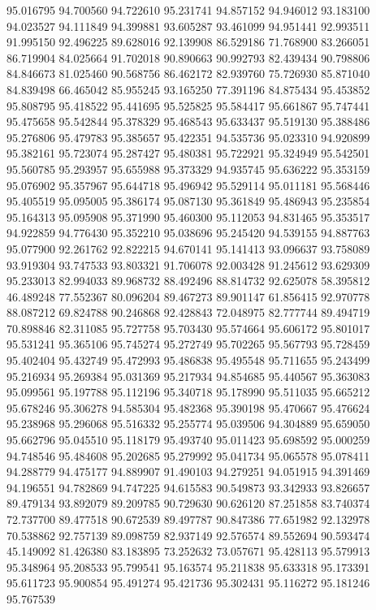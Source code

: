 95.016795
94.700560
94.722610
95.231741
94.857152
94.946012
93.183100
94.023527
94.111849
94.399881
93.605287
93.461099
94.951441
92.993511
91.995150
92.496225
89.628016
92.139908
86.529186
71.768900
83.266051
86.719904
84.025664
91.702018
90.890663
90.992793
82.439434
90.798806
84.846673
81.025460
90.568756
86.462172
82.939760
75.726930
85.871040
84.839498
66.465042
85.955245
93.165250
77.391196
84.875434
95.453852
95.808795
95.418522
95.441695
95.525825
95.584417
95.661867
95.747441
95.475658
95.542844
95.378329
95.468543
95.633437
95.519130
95.388486
95.276806
95.479783
95.385657
95.422351
94.535736
95.023310
94.920899
95.382161
95.723074
95.287427
95.480381
95.722921
95.324949
95.542501
95.560785
95.293957
95.655988
95.373329
94.935745
95.636222
95.353159
95.076902
95.357967
95.644718
95.496942
95.529114
95.011181
95.568446
95.405519
95.095005
95.386174
95.087130
95.361849
95.486943
95.235854
95.164313
95.095908
95.371990
95.460300
95.112053
94.831465
95.353517
94.922859
94.776430
95.352210
95.038696
95.245420
94.539155
94.887763
95.077900
92.261762
92.822215
94.670141
95.141413
93.096637
93.758089
93.919304
93.747533
93.803321
91.706078
92.003428
91.245612
93.629309
95.233013
82.994033
89.968732
88.492496
88.814732
92.625078
58.395812
46.489248
77.552367
80.096204
89.467273
89.901147
61.856415
92.970778
88.087212
69.824788
90.246868
92.428843
72.048975
82.777744
89.494719
70.898846
82.311085
95.727758
95.703430
95.574664
95.606172
95.801017
95.531241
95.365106
95.745274
95.272749
95.702265
95.567793
95.728459
95.402404
95.432749
95.472993
95.486838
95.495548
95.711655
95.243499
95.216934
95.269384
95.031369
95.217934
94.854685
95.440567
95.363083
95.099561
95.197788
95.112196
95.340718
95.178990
95.511035
95.665212
95.678246
95.306278
94.585304
95.482368
95.390198
95.470667
95.476624
95.238968
95.296068
95.516332
95.255774
95.039506
94.304889
95.659050
95.662796
95.045510
95.118179
95.493740
95.011423
95.698592
95.000259
94.748546
95.484608
95.202685
95.279992
95.041734
95.065578
95.078411
94.288779
94.475177
94.889907
91.490103
94.279251
94.051915
94.391469
94.196551
94.782869
94.747225
94.615583
90.549873
93.342933
93.826657
89.479134
93.892079
89.209785
90.729630
90.626120
87.251858
83.740374
72.737700
89.477518
90.672539
89.497787
90.847386
77.651982
92.132978
70.538862
92.757139
89.098759
82.937149
92.576574
89.552694
90.593474
45.149092
81.426380
83.183895
73.252632
73.057671
95.428113
95.579913
95.348964
95.208533
95.799541
95.163574
95.211838
95.633318
95.173391
95.611723
95.900854
95.491274
95.421736
95.302431
95.116272
95.181246
95.767539
